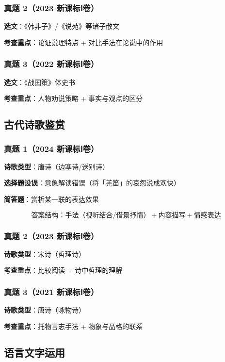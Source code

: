 \subsubsection{真题 2（2023 新课标Ⅰ卷）}

\textbf{选文}：《韩非子》/《说苑》等诸子散文

\textbf{考查重点}：论证说理特点 + 对比手法在论说中的作用

\subsubsection{真题 3（2022 新课标Ⅰ卷）}

\textbf{选文}：《战国策》体史书

\textbf{考查重点}：人物劝说策略 + 事实与观点的区分

\subsection{古代诗歌鉴赏}

\subsubsection{真题 1（2024 新课标Ⅰ卷）}

\textbf{诗歌类型}：唐诗（边塞诗/送别诗）

\textbf{选择题设误}：意象解读错误（将「羌笛」的哀怨说成欢快）

\textbf{简答题}：赏析某一联的表达效果

\[
\text{答案结构}：手法（视听结合/借景抒情）+ 内容描写 + 情感表达
\]

\subsubsection{真题 2（2023 新课标Ⅰ卷）}

\textbf{诗歌类型}：宋诗（哲理诗）

\textbf{考查重点}：比较阅读 + 诗中哲理的理解

\subsubsection{真题 3（2021 新课标Ⅰ卷）}

\textbf{诗歌类型}：唐诗（咏物诗）

\textbf{考查重点}：托物言志手法 + 物象与品格的联系

\subsection{语言文字运用}

